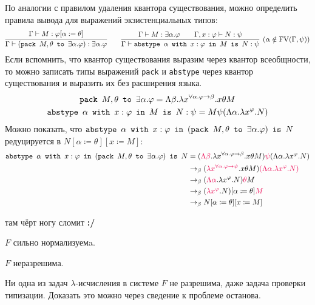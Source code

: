 По аналогии с правилом удаления квантора существования, можно определить правила вывода для выражений экзистенциальных типов:
\[
    \infer{\Gamma\vdash (\pack{M, \theta}{\exists \alpha . \varphi}) : \exists \alpha.\varphi}
        {\Gamma \vdash M : \varphi[\alpha := \theta]} \qquad
    \infer[(\alpha \notin \FV(\Gamma, \psi))]
        {\Gamma \vdash \abstype{\alpha}{x:\varphi}{M}{N:\psi}}
        {\Gamma \vdash M : \exists \alpha . \varphi && \Gamma, x : \varphi \vdash N : \psi}
\]
Если вспомнить, что квантор существования выразим через квантор всеобщности, то можно записать типы выражений
\texttt{pack} и \texttt{abstype} через квантор существования и выразить их без расширения языка.
\begin{gather*}
    \mathinner{\mathtt{pack}}~M, \theta~\mathinner{\mathtt{to}}~\exists \alpha . \varphi =
        \Lambda \beta . \lambda x^{\forall \alpha . \varphi \to \beta} . x \theta M \\
    \mathinner{\mathtt{abstype}}~\alpha~\mathinner{\mathtt{with}}~x : \varphi~\mathinner{\mathtt{in}}~M~\mathinner{\mathtt{is}}~N:\psi =
        M \psi (\Lambda \alpha . \lambda x ^ \varphi . N)
\end{gather*}
Можно показать, что $\mathinner{\mathtt{abstype}}~\alpha~\mathinner{\mathtt{with}}~x:\varphi~\mathinner{\mathtt{in}}~(\mathinner{\mathtt{pack}}~M,\theta~\mathinner{\mathtt{to}}~\exists\alpha .\varphi)~\mathinner{\mathtt{is}}~N$
        редуцируется в $N[\alpha\coloneqq\theta][x\coloneqq M]$:
\begin{align*}
    \abstype{\alpha}{x:\varphi}{(\pack{M,\theta}{\exists\alpha .\varphi})}{N}
    &= (\reduction{\Lambda \beta} . \lambda x^{\forall \alpha . \varphi \to \beta} . x \theta M)
        \reduction{\psi} (\Lambda \alpha . \lambda x ^ \varphi . N) \\
    &\to_\beta (\reduction{\lambda x^{\forall \alpha . \varphi \to \psi}} . x \theta M)
        \reduction{(\Lambda \alpha . \lambda x ^ \varphi . N)} \\
    &\to_\beta (\reduction{\Lambda \alpha} . \lambda x^\varphi . N) \reduction\theta M \\
    &\to_\beta (\reduction{\lambda x^\varphi} . N)[\alpha\coloneqq\theta] \reduction M \\
    &\to_\beta N[\alpha\coloneqq\theta][x\coloneqq M]
\end{align*}

\begin{example} \todo там чёрт ногу сломит \textbf{:/}
\end{example}

\begin{statement}
    $F$ сильно нормализуемa.
\end{statement}

\begin{statement}
    $F$ неразрешима.
\end{statement}
Ни одна из задач $\lambda$-исчисления в системе $F$ не разрешима, даже задача проверки типизации.
Доказать это можно через сведение к проблеме останова.


